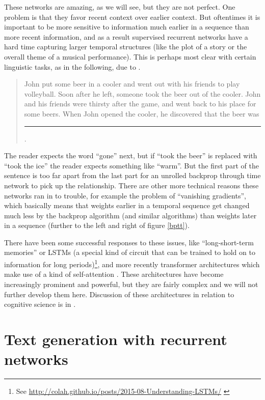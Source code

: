 These networks are amazing, as we will see, but they are not perfect. One problem is that they favor recent context over earlier context. But oftentimes it is important to be more sensitive to  information much earlier in a sequence than more recent information, and as a result supervised recurrent networks have a hard time capturing larger temporal structures (like the plot of a story or the overall theme of a musical performance). This is perhaps most clear with certain linguistic tasks, as in the following, due to \cite{mcclelland2020placing}.
\begin{quote}
John put some beer in a cooler and went out with his friends to play volleyball. Soon after he left, someone took the beer out of the cooler. John and his friends were thirsty after the game, and went back to his place for some beers. When John opened the cooler, he discovered that the beer was \rule{1cm}{0.15mm}.
\end{quote}
The reader expects the word ``gone'' next, but if ``took the beer'' is replaced with ``took the ice'' the reader expects something like ``warm''. But the first part of the sentence is too far apart from the last part for an unrolled backprop through time network to pick up the relationship. There are other more technical reasons these networks ran in to trouble, for example the problem of ``vanishing gradients'', which basically means that weights earlier in a temporal sequence get changed much less by the backprop algorithm (and similar algorithms) than weights later in a sequence (further to the left and right of figure \ref{bptt}). 

There have been some successful responses to these issues, like ``long-short-term memories'' or LSTMs (a special kind of circuit that can be trained to hold on to information for long periods)\footnote{See \url{http://colah.github.io/posts/2015-08-Understanding-LSTMs/} \cite{olah2015understanding}}, and more recently transformer architectures which make use of a kind of self-attention \cite{vaswani2017attention}. These architectures have become increasingly prominent and powerful, but they are fairly complex and we will not further develop them here. Discussion of these architectures in relation to cognitive science is in \cite{mcclelland2020placing}.

\section{Text generation with recurrent networks}

